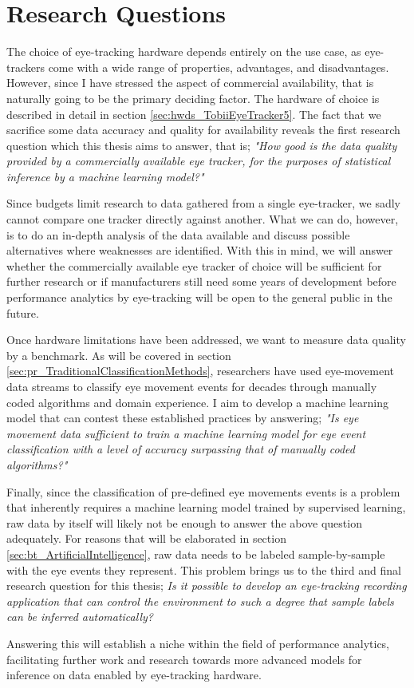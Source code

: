\section{Research Questions} \label{sec:intro_research}

The choice of eye-tracking hardware depends entirely on the use case, as eye-trackers come with a wide range of properties, advantages, and disadvantages. However, since I have stressed the aspect of commercial availability, that is naturally going to be the primary deciding factor. The hardware of choice is described in detail in section \ref{sec:hwds_TobiiEyeTracker5}. The fact that we sacrifice some data accuracy and quality for availability reveals the first research question which this thesis aims to answer, that is; \textit{"How good is the data quality provided by a commercially available eye tracker, for the purposes of statistical inference by a machine learning model?"}

Since budgets limit research to data gathered from a single eye-tracker, we sadly cannot compare one tracker directly against another. What we can do, however, is to do an in-depth analysis of the data available and discuss possible alternatives where weaknesses are identified. With this in mind, we will answer whether the commercially available eye tracker of choice will be sufficient for further research or if manufacturers still need some years of development before performance analytics by eye-tracking will be open to the general public in the future.

Once hardware limitations have been addressed, we want to measure data quality by a benchmark. As will be covered in section \ref{sec:pr_TraditionalClassificationMethods}, researchers have used eye-movement data streams to classify eye movement events for decades through manually coded algorithms and domain experience. I aim to develop a machine learning model that can contest these established practices by answering; \textit{"Is eye movement data sufficient to train a machine learning model for eye event classification with a level of accuracy surpassing that of manually coded algorithms?"} 

Finally, since the classification of pre-defined eye movements events is a problem that inherently requires a machine learning model trained by supervised learning, raw data by itself will likely not be enough to answer the above question adequately. For reasons that will be elaborated in section \ref{sec:bt_ArtificialIntelligence}, raw data needs to be labeled sample-by-sample with the eye events they represent. This problem brings us to the third and final research question for this thesis; \textit{Is it possible to develop an eye-tracking recording application that can control the environment to such a degree that sample labels can be inferred automatically?} 

Answering this will establish a niche within the field of performance analytics, facilitating further work and research towards more advanced models for inference on data enabled by eye-tracking hardware.
